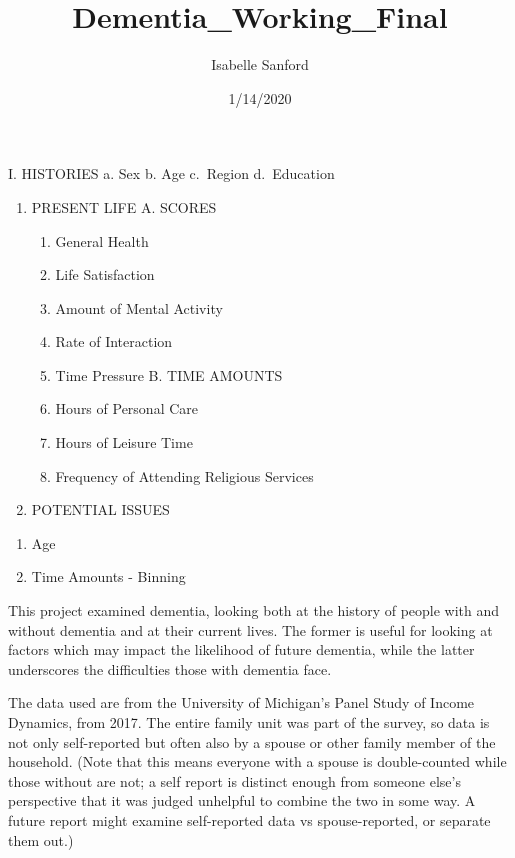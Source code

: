 \documentclass[]{article}
\title{Dementia\_Working\_Final}
\author{Isabelle Sanford}
\date{1/14/2020}
\providecommand{\tightlist}{%
  \setlength{\itemsep}{0pt}\setlength{\parskip}{0pt}}
\begin{document}
\maketitle

I. HISTORIES a. Sex b. Age c.~Region d.~Education

\begin{enumerate}
\def\labelenumi{\Roman{enumi}.}
\setcounter{enumi}{1}
\tightlist
\item
  PRESENT LIFE A. SCORES

  \begin{enumerate}
  \def\labelenumii{\alph{enumii}.}
  \tightlist
  \item
    General Health
  \item
    Life Satisfaction
  \item
    Amount of Mental Activity
  \item
    Rate of Interaction
  \item
    Time Pressure B. TIME AMOUNTS
  \item
    Hours of Personal Care
  \item
    Hours of Leisure Time
  \item
    Frequency of Attending Religious Services
  \end{enumerate}
\item
  POTENTIAL ISSUES
\end{enumerate}

\begin{enumerate}
\def\labelenumi{\alph{enumi}.}
\tightlist
\item
  Age
\item
  Time Amounts - Binning
\end{enumerate}

This project examined dementia, looking both at the history of people
with and without dementia and at their current lives. The former is
useful for looking at factors which may impact the likelihood of future
dementia, while the latter underscores the difficulties those with
dementia face.

The data used are from the University of Michigan's Panel Study of
Income Dynamics, from 2017. The entire family unit was part of the
survey, so data is not only self-reported but often also by a spouse or
other family member of the household. (Note that this means everyone
with a spouse is double-counted while those without are not; a self
report is distinct enough from someone else's perspective that it was
judged unhelpful to combine the two in some way. A future report might
examine self-reported data vs spouse-reported, or separate them out.)
\end{document}
